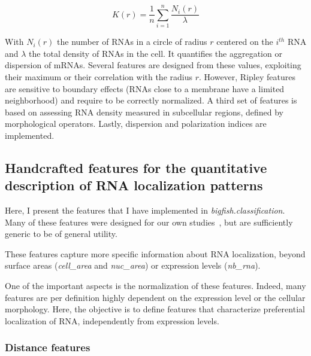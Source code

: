 \begin{equation}
	{\displaystyle K(r) = \frac{1}{n} \sum_{i = 1}^{n} \frac{N_i(r)}{\lambda}}
\end{equation}

\noindent
With $N_i(r)$ the number of \ac{RNA}s in a circle of radius $r$ centered on the $i^{th}$ \ac{RNA} and $\lambda$ the total density of \ac{RNA}s in the cell.
It quantifies the aggregation or dispersion of mRNAs.
Several features are designed from these values, exploiting their maximum or their correlation with the radius $r$.
However, Ripley features are sensitive to boundary effects (\ac{RNA}s close to a membrane have a limited neighborhood) and require to be correctly normalized.
A third set of features is based on assessing \ac{RNA} density measured in subcellular regions, defined by morphological operators. 
Lastly, dispersion and polarization indices are implemented.

\subsection{Handcrafted features for the quantitative description of RNA localization patterns}
\label{subsec:expert_features}

Here, I present the features that I have implemented in \emph{bigfish.classification}. 
Many of these features were designed for our own studies~\cite{CHOUAIB_2020,safieddine_choreography_2021,pichon_kinesin_2021}, but are sufficiently generic to be of general utility. 

These features capture more specific information about \ac{RNA} localization, beyond surface areas (\emph{cell\_area} and \emph{nuc\_area}) or expression levels (\emph{nb\_rna}). 

One of the important aspects is the normalization of these features. Indeed, many features are per definition highly dependent on the expression level or the cellular morphology. Here, the objective is to define features that characterize preferential localization of \ac{RNA}, independently from expression levels. 

\subsubsection{Distance features}

